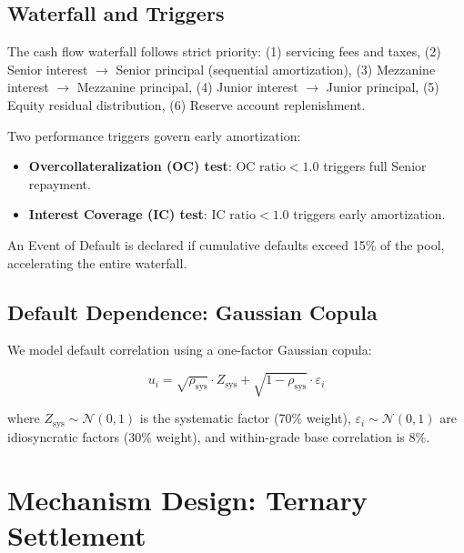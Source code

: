 \documentclass[12pt,a4paper]{article}
\begin{document}
\subsection{Waterfall and Triggers}

The cash flow waterfall follows strict priority: (1) servicing fees and taxes, (2) Senior interest $\to$ Senior principal (sequential amortization), (3) Mezzanine interest $\to$ Mezzanine principal, (4) Junior interest $\to$ Junior principal, (5) Equity residual distribution, (6) Reserve account replenishment.

Two performance triggers govern early amortization:
\begin{itemize}[nosep]
    \item \textbf{Overcollateralization (OC) test}: $\text{OC ratio} < 1.0$ triggers full Senior repayment.
    \item \textbf{Interest Coverage (IC) test}: $\text{IC ratio} < 1.0$ triggers early amortization.
\end{itemize}

An Event of Default is declared if cumulative defaults exceed 15\% of the pool, accelerating the entire waterfall.

\subsection{Default Dependence: Gaussian Copula}

We model default correlation using a one-factor Gaussian copula:

\begin{equation}
    u_i = \sqrt{\rho_{\text{sys}}} \cdot Z_{\text{sys}} + \sqrt{1 - \rho_{\text{sys}}} \cdot \varepsilon_i
\end{equation}

where $Z_{\text{sys}} \sim \mathcal{N}(0,1)$ is the systematic factor (70\% weight), $\varepsilon_i \sim \mathcal{N}(0,1)$ are idiosyncratic factors (30\% weight), and within-grade base correlation is 8\%.

\section{Mechanism Design: Ternary Settlement}
\end{document}
